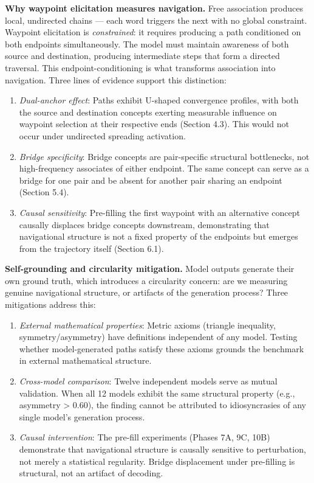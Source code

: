 \textbf{Why waypoint elicitation measures navigation.} Free association produces local, undirected chains --- each word triggers the next with no global constraint. Waypoint elicitation is \emph{constrained}: it requires producing a path conditioned on both endpoints simultaneously. The model must maintain awareness of both source and destination, producing intermediate steps that form a directed traversal. This endpoint-conditioning is what transforms association into navigation. Three lines of evidence support this distinction:

\begin{enumerate}
\def\labelenumi{\arabic{enumi}.}
\tightlist
\item
  \emph{Dual-anchor effect}: Paths exhibit U-shaped convergence profiles, with both the source and destination concepts exerting measurable influence on waypoint selection at their respective ends (Section 4.3). This would not occur under undirected spreading activation.
\item
  \emph{Bridge specificity}: Bridge concepts are pair-specific structural bottlenecks, not high-frequency associates of either endpoint. The same concept can serve as a bridge for one pair and be absent for another pair sharing an endpoint (Section 5.4).
\item
  \emph{Causal sensitivity}: Pre-filling the first waypoint with an alternative concept causally displaces bridge concepts downstream, demonstrating that navigational structure is not a fixed property of the endpoints but emerges from the trajectory itself (Section 6.1).
\end{enumerate}

\textbf{Self-grounding and circularity mitigation.} Model outputs generate their own ground truth, which introduces a circularity concern: are we measuring genuine navigational structure, or artifacts of the generation process? Three mitigations address this:

\begin{enumerate}
\def\labelenumi{\arabic{enumi}.}
\tightlist
\item
  \emph{External mathematical properties}: Metric axioms (triangle inequality, symmetry/asymmetry) have definitions independent of any model. Testing whether model-generated paths satisfy these axioms grounds the benchmark in external mathematical structure.
\item
  \emph{Cross-model comparison}: Twelve independent models serve as mutual validation. When all 12 models exhibit the same structural property (e.g., asymmetry \textgreater{} 0.60), the finding cannot be attributed to idiosyncrasies of any single model's generation process.
\item
  \emph{Causal intervention}: The pre-fill experiments (Phases 7A, 9C, 10B) demonstrate that navigational structure is causally sensitive to perturbation, not merely a statistical regularity. Bridge displacement under pre-filling is structural, not an artifact of decoding.
\end{enumerate}

